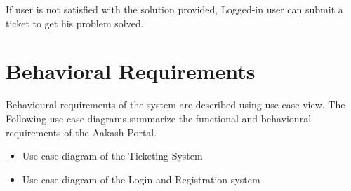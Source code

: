 \documentclass[letterpaper,10pt,english]{sphinxmanual}
\begin{document}
If user is not satisfied with the solution provided, Logged-in user can submit a ticket to get his problem solved.


\chapter{Behavioral Requirements}
\label{unifieddoc:behavioral-requirements}
Behavioural requirements of the system are described using use case view. The Following use case diagrams summarize the functional and behavioural requirements of the Aakash Portal.
\begin{itemize}
\item {} 
Use case diagram of the Ticketing System

\end{itemize}
\begin{figure}[htbp]
\centering

\end{figure}
\begin{itemize}
\item {} 
Use case diagram of the Login and Registration system

\end{itemize}
\end{document}
